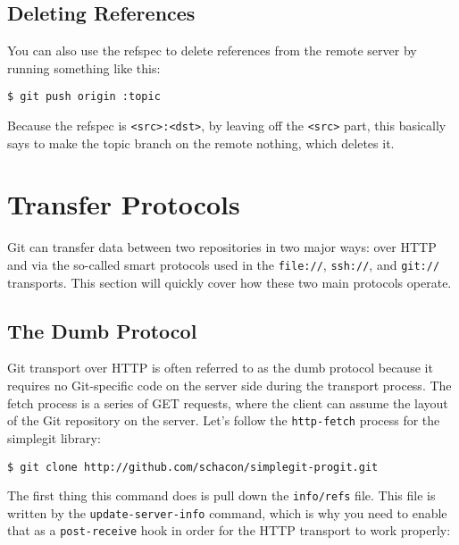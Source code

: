 \documentclass[a4paper]{book}
\begin{document}
\subsection{Deleting References}\label{deleting-references}

You can also use the refspec to delete references from the remote server by running something like this:

\begin{shaded}\begin{verbatim}
$ git push origin :topic
\end{verbatim}\end{shaded}

Because the refspec is \texttt{\textless{}src\textgreater{}:\textless{}dst\textgreater{}}, by leaving off the \texttt{\textless{}src\textgreater{}} part, this basically says to make the topic branch on the remote nothing, which deletes it.

\section{Transfer Protocols}\label{transfer-protocols}

Git can transfer data between two repositories in two major ways: over HTTP and via the so-called smart protocols used in the \texttt{file://}, \texttt{ssh://}, and \texttt{git://} transports. This section will quickly cover how these two main protocols operate.

\subsection{The Dumb Protocol}\label{the-dumb-protocol}

Git transport over HTTP is often referred to as the dumb protocol because it requires no Git-specific code on the server side during the transport process. The fetch process is a series of GET requests, where the client can assume the layout of the Git repository on the server. Let's follow the \texttt{http-fetch} process for the simplegit library:

\begin{shaded}\begin{verbatim}
$ git clone http://github.com/schacon/simplegit-progit.git
\end{verbatim}\end{shaded}

The first thing this command does is pull down the \texttt{info/refs} file. This file is written by the \texttt{update-server-info} command, which is why you need to enable that as a \texttt{post-receive} hook in order for the HTTP transport to work properly:
\end{document}
